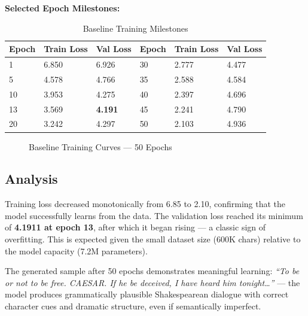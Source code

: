 \documentclass[12pt,a4paper]{article}
\begin{document}
\textbf{Selected Epoch Milestones:}

\begin{table}[H]
\centering
\caption{Baseline Training Milestones}
\small
\begin{tabular}{C{1.5cm}C{2.5cm}C{2.5cm}C{1.5cm}C{2.5cm}C{2.5cm}}
  \toprule
  \textbf{Epoch} & \textbf{Train Loss} & \textbf{Val Loss} &
  \textbf{Epoch} & \textbf{Train Loss} & \textbf{Val Loss} \\
    & 6.850 & 6.926 & 30 & 2.777 & 4.477 \\
  5  & 4.578 & 4.766 & 35 & 2.588 & 4.584 \\
  10 & 3.953 & 4.275 & 40 & 2.397 & 4.696 \\
  13 & 3.569 & \textbf{4.191} & 45 & 2.241 & 4.790 \\
  20 & 3.242 & 4.297 & 50 & 2.103 & 4.936 \\
  \bottomrule
\end{tabular}
\end{table}

\begin{figure}[H]
  \centering
  \caption{Baseline Training Curves — 50 Epochs}
\end{figure}

\subsection{Analysis}

Training loss decreased monotonically from 6.85 to 2.10, confirming that the model successfully learns from the data. The validation loss reached its minimum of \textbf{4.1911 at epoch 13}, after which it began rising — a classic sign of overfitting. This is expected given the small dataset size (600K chars) relative to the model capacity (7.2M parameters).

The generated sample after 50 epochs demonstrates meaningful learning: \textit{``To be or not to be free. CAESAR. If he be deceived, I have heard him tonight\ldots''} — the model produces grammatically plausible Shakespearean dialogue with correct character cues and dramatic structure, even if semantically imperfect.
\end{document}
